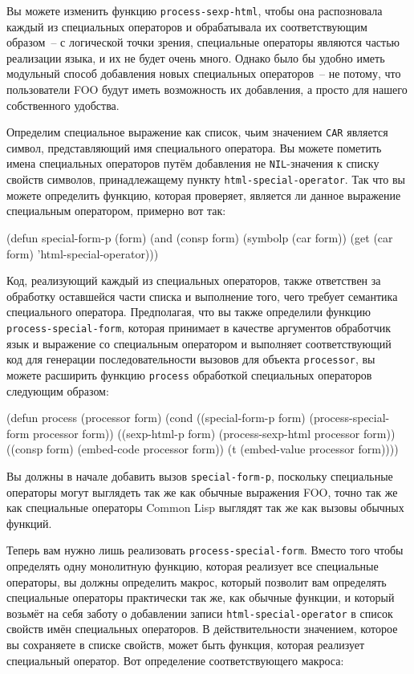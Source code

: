 Вы можете изменить функцию \lstinline{process-sexp-html}, чтобы она распозновала каждый из
специальных операторов и обрабатывала их соответствующим образом~-- с логической точки
зрения, специальные операторы являются частью реализации языка, и их не будет очень
много. Однако было бы удобно иметь модульный способ добавления новых специальных
операторов~-- не потому, что пользователи FOO будут иметь возможность их добавления, а
просто для нашего собственного удобства.

Определим специальное выражение как список, чьим значением \lstinline{CAR} является
символ, представляющий имя специального оператора.  Вы можете пометить имена специальных
операторов путём добавления не \lstinline{NIL}-значения к списку свойств символов,
принадлежащему пункту \lstinline{html-special-operator}.  Так что вы можете определить
функцию, которая проверяет, является ли данное выражение специальным оператором, примерно
вот так:

\begin{myverb}
(defun special-form-p (form)
  (and (consp form) (symbolp (car form)) (get (car form) 'html-special-operator)))
\end{myverb}

Код, реализующий каждый из специальных операторов, также ответствен за обработку
оставшейся части списка и выполнение того, чего требует семантика специального оператора.
Предполагая, что вы также определили функцию \lstinline{process-special-form}, которая
принимает в качестве аргументов обработчик язык и выражение со специальным оператором и
выполняет соответствующий код для генерации последовательности вызовов для объекта
\lstinline{processor}, вы можете расширить функцию \lstinline{process} обработкой
специальных операторов следующим образом:

\begin{myverb}
(defun process (processor form)
  (cond
    ((special-form-p form) (process-special-form processor form))
    ((sexp-html-p form)    (process-sexp-html processor form))
    ((consp form)          (embed-code processor form))
    (t                     (embed-value processor form))))
\end{myverb}

Вы должны в начале добавить вызов \lstinline{special-form-p}, поскольку специальные операторы
могут выглядеть так же как обычные выражения FOO, точно так же как специальные операторы
Common Lisp выглядят так же как вызовы обычных функций.

Теперь вам нужно лишь реализовать \lstinline{process-special-form}.  Вместо того чтобы
определять одну монолитную функцию, которая реализует все специальные операторы, вы должны
определить макрос, который позволит вам определять специальные операторы практически
так же, как обычные функции, и который возьмёт на себя заботу о добавлении записи
\lstinline{html-special-operator} в список свойств имён специальных операторов.  В
действительности значением, которое вы сохраняете в списке свойств, может быть функция,
которая реализует специальный оператор.  Вот определение соответствующего макроса:

